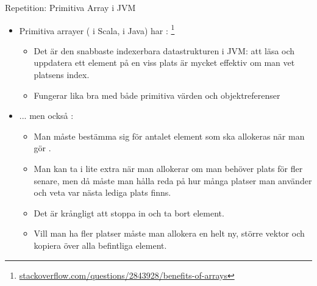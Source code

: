 \begin{Slide}{Repetition: Primitiva Array i JVM}
\begin{itemize}
\item Primitiva arrayer ( i Scala, \code{[]} i Java) har :%
\footnote{\href{http://stackoverflow.com/questions/2843928/benefits-of-arrays}{stackoverflow.com/questions/2843928/benefits-of-arrays}} 
\begin{itemize}\footnotesize
\item Det är den snabbaste indexerbara datastrukturen i JVM: att läsa och uppdatera ett element på en viss plats är mycket effektiv om man vet platsens index. 
\item Fungerar lika bra med både primitiva värden och objektreferenser
\end{itemize}
\item ... men också :
\begin{itemize}\footnotesize
\item Man måste bestämma sig för antalet element som ska allokeras när man gör . 
\item Man kan ta i lite extra när man allokerar om man behöver plats för fler senare, men då måste man hålla reda på hur många platser man använder och veta var nästa lediga plats finns.
\item Det är krångligt att stoppa in  och ta bort  element.
\item Vill man ha fler platser måste man allokera en helt ny, större vektor och kopiera över alla befintliga element.
\end{itemize}

\end{itemize}
\end{Slide}





